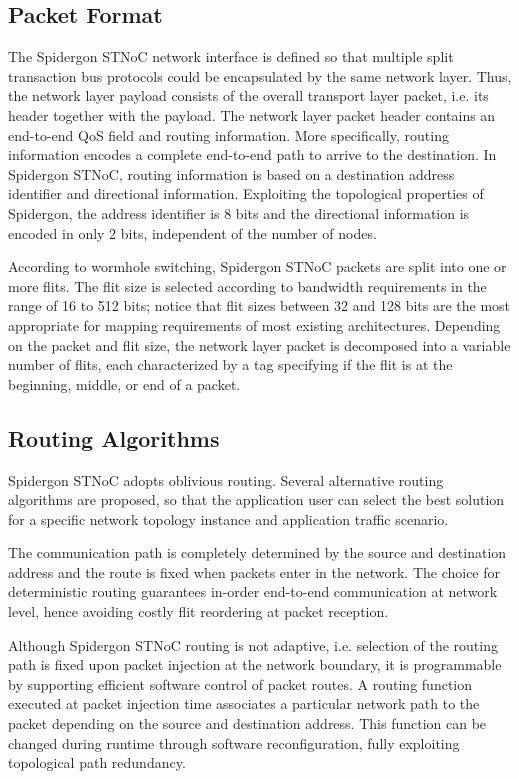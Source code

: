 \subsection{Packet Format}\label{S:packet_format}

The Spidergon STNoC network interface is defined so that multiple split transaction bus protocols could be encapsulated by the same network layer. 
Thus, the network layer payload consists of the overall transport layer packet, i.e. its header together with the payload. 
The network layer packet header contains an end-to-end QoS field and routing information. 
More specifically, routing information encodes a complete end-to-end path to arrive to the destination.
 In Spidergon STNoC, routing information is based on a destination address identifier and directional information. 
 Exploiting the topological properties of Spidergon, the address identifier is 8 bits and the directional information is encoded in only 2 bits, independent of the number of nodes.
 
According to wormhole switching, Spidergon STNoC packets are split into one or more flits. 
The flit size is selected according to bandwidth requirements in the range of 16 to 512 bits; notice that flit sizes between 32 and 128 bits are the most appropriate for mapping requirements of most existing architectures. 
Depending on the packet and flit size, the network layer packet is decomposed into a variable number of flits, each characterized by a tag specifying if the flit is at the beginning, middle, or end of a packet.

\subsection{Routing Algorithms}\label{S:routing}

Spidergon STNoC adopts oblivious routing. 
Several alternative routing algorithms are proposed, so that the application user can select the best solution for a specific network topology instance and application traffic scenario.

The communication path is completely determined by the source and destination address and the route is fixed when packets enter in the network. 
The choice for deterministic routing guarantees in-order end-to-end communication at network level, hence avoiding costly flit reordering at packet reception. 

Although Spidergon STNoC routing is not adaptive, i.e. selection of the routing path is fixed upon packet injection at the network boundary, it is programmable by supporting efficient software control of packet routes. 
A routing function executed at packet injection time associates a particular network path to the packet depending on the source and destination address. 
This function can be changed during runtime through software reconfiguration, fully exploiting topological path redundancy.

